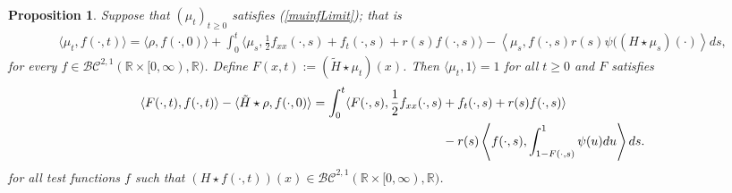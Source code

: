 \documentclass{article}
\newtheorem{propn}[theorem]{Proposition}
\newcommand{\B}[1]{\mathbb{#1}}
\newcommand{\C}[1]{\mathcal{#1}}
\begin{document}
\vspace{1em}

\begin{propn} \label{cdfPdfEquiv}
    Suppose that $(\mu_t)_{t\geq 0}$ satisfies (\ref{muinfLimit}); that is
    \begin{align*} \langle \mu_t, f(\cdot,t)\rangle = \langle \rho ,f(\cdot,0)\rangle + \int_0^t \langle \mu_s,\frac12 f_{xx}(\cdot,s)+f_t(\cdot,s) + r(s)f(\cdot,s)\rangle - \left\langle \mu_s,f(\cdot,s)r(s)\psi((H\star\mu_s)(\cdot)\right\rangle ds, 
    \end{align*}
    for every $f\in \C{BC}^{2,1}(\B{R}\times [0,\infty),\B{R})$. %
    Define $F(x,t):=(\tilde{H}\star \mu_t)(x)$. Then $\langle \mu_t,1\rangle=1$ for all $t\geq 0$ and $F$ %
    satisfies
    \begin{align}\label{cdfFormulation}
        \langle F(\cdot,t),f(\cdot,t)\rangle - \langle \tilde{H}\star \rho, f(\cdot,0)\rangle = \int_0^t \langle F(\cdot,s),\frac12 f_{xx}(\cdot,s) &+ f_t(\cdot,s) + r(s)f(\cdot,s)\rangle \\
        &- r(s)\left\langle f(\cdot,s),\int_{1-F(\cdot,s)}^1 \psi(u)du\right\rangle ds. \notag
    \end{align}
    for all test functions $f$ such that $(H\star f(\cdot,t))(x)\in \C{BC}^{2,1}(\B{R}\times [0,\infty),\B{R})$.
\end{propn}
\end{document}
